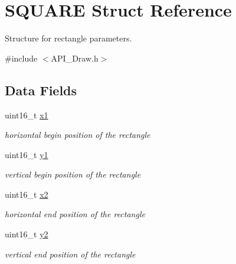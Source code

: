 \hypertarget{struct_s_q_u_a_r_e}{}\section{S\+Q\+U\+A\+RE Struct Reference}
\label{struct_s_q_u_a_r_e}


Structure for rectangle parameters.  




{\ttfamily \#include $<$A\+P\+I\+\_\+\+Draw.\+h$>$}

\subsection*{Data Fields}
\begin{DoxyCompactItemize}
\item 
\mbox{\label{struct_s_q_u_a_r_e_aedb5fdfe3c1d1a915b668ba7f3950753}} 
uint16\+\_\+t \hyperlink{struct_s_q_u_a_r_e_aedb5fdfe3c1d1a915b668ba7f3950753}{x1}
\begin{DoxyCompactList}\small\item\em horizontal begin position of the rectangle \end{DoxyCompactList}\item 
\mbox{\label{struct_s_q_u_a_r_e_a47ada631c22a9d40348069145654f255}} 
uint16\+\_\+t \hyperlink{struct_s_q_u_a_r_e_a47ada631c22a9d40348069145654f255}{y1}
\begin{DoxyCompactList}\small\item\em vertical begin position of the rectangle \end{DoxyCompactList}\item 
\mbox{\label{struct_s_q_u_a_r_e_ac5bc000f8954f38b7a641a485a26bae7}} 
uint16\+\_\+t \hyperlink{struct_s_q_u_a_r_e_ac5bc000f8954f38b7a641a485a26bae7}{x2}
\begin{DoxyCompactList}\small\item\em horizontal end position of the rectangle \end{DoxyCompactList}\item 
\mbox{\label{struct_s_q_u_a_r_e_aa377184ba406b3f0c4ac18c935378204}} 
uint16\+\_\+t \hyperlink{struct_s_q_u_a_r_e_aa377184ba406b3f0c4ac18c935378204}{y2}
\begin{DoxyCompactList}\small\item\em vertical end position of the rectangle \end{DoxyCompactList}\item 

\end{DoxyCompactItemize}
